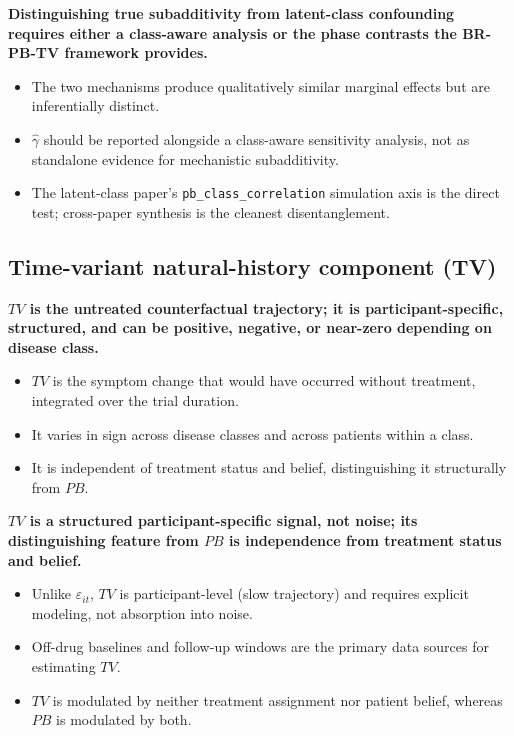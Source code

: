 \documentclass[
  11pt,
]{article}
\begin{document}
\textbf{Distinguishing true subadditivity from latent-class confounding requires either a class-aware analysis or the phase contrasts the BR-PB-TV framework provides.}

\begin{itemize}\setlength{\itemsep}{2pt}\setlength{\parskip}{0pt}
\item The two mechanisms produce qualitatively similar marginal effects but are inferentially distinct.
\item $\hat{\gamma}$ should be reported alongside a class-aware sensitivity analysis, not as standalone evidence for mechanistic subadditivity.
\item The latent-class paper's \texttt{pb\_class\_correlation} simulation axis is the direct test; cross-paper synthesis is the cleanest disentanglement.
\end{itemize}

\subsection{Time-variant natural-history component (TV)}\label{time-variant-natural-history-component-tv}

\textbf{$TV$ is the untreated counterfactual trajectory; it is participant-specific, structured, and can be positive, negative, or near-zero depending on disease class.}

\begin{itemize}\setlength{\itemsep}{2pt}\setlength{\parskip}{0pt}
\item $TV$ is the symptom change that would have occurred without treatment, integrated over the trial duration.
\item It varies in sign across disease classes and across patients within a class.
\item It is independent of treatment status and belief, distinguishing it structurally from $PB$.
\end{itemize}

\textbf{$TV$ is a structured participant-specific signal, not noise; its distinguishing feature from $PB$ is independence from treatment status and belief.}

\begin{itemize}\setlength{\itemsep}{2pt}\setlength{\parskip}{0pt}
\item Unlike $\varepsilon_{it}$, $TV$ is participant-level (slow trajectory) and requires explicit modeling, not absorption into noise.
\item Off-drug baselines and follow-up windows are the primary data sources for estimating $TV$.
\item $TV$ is modulated by neither treatment assignment nor patient belief, whereas $PB$ is modulated by both.
\end{itemize}
\end{document}
